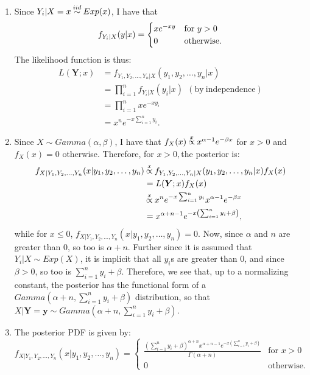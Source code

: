  
 \begin{problem}{20} $ $
\begin{enumerate}

\item Since $Y_i|X=x\distas{iid} Exp(x)$, I have that
\[
f_{Y_i|X}(y|x)=
  \begin{cases}
                                   x e^{-xy}& \text{for $ y>0$} \\
                                   0 & \text{otherwise}.
  \end{cases}
\]
The likelihood function is thus:
\begin{align*}
L(\bm Y; x) &= f_{Y_1, Y_2, \ldots, Y_n|X}(y_1,y_2, \ldots, y_n|x) \\
& = \prod_{i=1}^n f_{Y_i|X}(y_i|x)~~(\mathrm{by~independence}) \\
& = \prod_{i=1}^n x e^{-xy_i} \\
& = x^n e^{-x\sum_{i=1}^n y_i}.
\end{align*}

\item Since $X\sim Gamma(\alpha, \beta)$, I have that $f_X(x) \propof{x} x^{\alpha-1} e^{-\beta x}$ for $x>0$ and $f_X(x)=0$ otherwise.  Therefore, for $x>0, $the posterior is:
\begin{align*}
f_{X|Y_1, Y_2, \ldots, Y_n}(x|y_1,y_2, \ldots, y_n) &\propof{x} f_{Y_1, Y_2, \ldots, Y_n|X}(y_1,y_2, \ldots, y_n|x) f_X(x) \\
& = L(\bm Y; x) f_X(x) \\
& \propof{x}  x^n e^{-x\sum_{i=1}^n y_i} x^{\alpha-1}e^{-\beta x} \\
& = x^{\alpha+n-1}e^{-x\left(\sum_{i=1}^n y_i +\beta \right)},
\end{align*}
while for $x \le 0$, $f_{X|Y_1, Y_2, \ldots, Y_n}(x|y_1,y_2, \ldots, y_n)=0$. Now, since $\alpha$ and $n$ are greater than 0, so too is $\alpha+n$.  Further since it is assumed that $Y_i|X \sim Exp(X)$, it is implicit that all $y_i$s are greater than 0, and since $\beta>0$, so too is $\sum_{i=1}^n y_i +\beta $.  Therefore, we see that, up to a normalizing constant, the posterior has the functional form of a $Gamma(\alpha+n, \sum_{i=1}^n y_i +\beta )$ distribution, so that $X|\bm{Y}=\bm{y} \sim Gamma(\alpha+n, \sum_{i=1}^n y_i +\beta )$.

\item The posterior PDF is given by:
\[
f_{X|Y_1, Y_2, \ldots, Y_n}(x|y_1,y_2, \ldots, y_n)=
  \begin{cases}
                                   \frac{(\sum_{i=1}^n y_i +\beta)^{\alpha+n}x^{\alpha+n-1}e^{-x\left(\sum_{i=1}^n y_i +\beta \right)} }{\Gamma(\alpha+n)}& \text{for $x>0$}\\
                                   0 & \text{otherwise}.
  \end{cases}
\]



\end{enumerate}
\end{problem}

